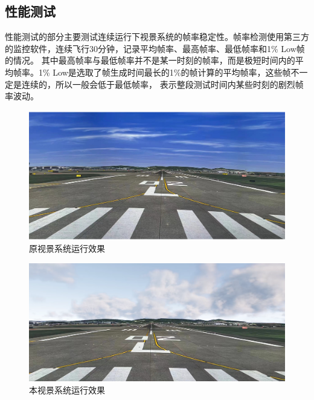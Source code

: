 \subsection{性能测试}
性能测试的部分主要测试连续运行下视景系统的帧率稳定性。帧率检测使用第三方的监控软件，连续飞行30分钟，记录平均帧率、最高帧率、最低帧率和1\% Low帧的情况。
其中最高帧率与最低帧率并不是某一时刻的帧率，而是极短时间内的平均帧率。1\% Low是选取了帧生成时间最长的1\%的帧计算的平均帧率，这些帧不一定是连续的，所以一般会低于最低帧率，
表示整段测试时间内某些时刻的剧烈帧率波动。
\clearpage
\begin{figure}[h!]
    \begin{center}
        \includegraphics[width=\textwidth]{pictures/ffs2.png}
        \caption{原视景系统运行效果}
        \label{flightffs}
    \end{center}
\end{figure}
\vspace{7pt}
\begin{figure}[h!]
    \begin{center}
        \includegraphics[width=\textwidth]{pictures/ourffs.png}
        \caption{本视景系统运行效果}
        \label{flighttest}
    \end{center}
\end{figure}
\par
